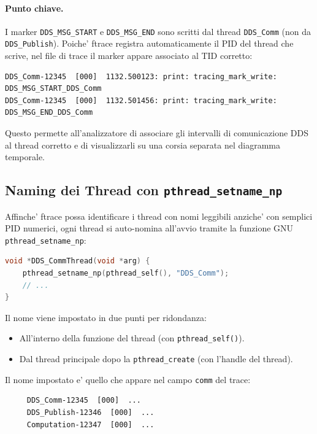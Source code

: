 \paragraph{Punto chiave.}
I marker \texttt{DDS\_MSG\_START} e \texttt{DDS\_MSG\_END} sono scritti
dal thread \texttt{DDS\_Comm} (non da \texttt{DDS\_Publish}). Poiche'
ftrace registra automaticamente il PID del thread che scrive, nel file
di trace il marker appare associato al TID corretto:

\begin{verbatim}
DDS_Comm-12345  [000]  1132.500123: print: tracing_mark_write: DDS_MSG_START_DDS_Comm
DDS_Comm-12345  [000]  1132.501456: print: tracing_mark_write: DDS_MSG_END_DDS_Comm
\end{verbatim}

Questo permette all'analizzatore di associare gli intervalli di comunicazione
DDS al thread corretto e di visualizzarli su una corsia separata nel
diagramma temporale.

\subsection{Naming dei Thread con \texttt{pthread\_setname\_np}}
\label{subsec:naming}

Affinche' ftrace possa identificare i thread con nomi leggibili anziche'
con semplici PID numerici, ogni thread si auto-nomina all'avvio tramite
la funzione GNU \texttt{pthread\_setname\_np}:

\begin{lstlisting}[language=C, caption={Assegnazione del nome al thread DDS\_Comm.}, label={lst:setname}]
void *DDS_CommThread(void *arg) {
    pthread_setname_np(pthread_self(), "DDS_Comm");
    // ...
}
\end{lstlisting}

Il nome viene impostato in due punti per ridondanza:
\begin{itemize}
    \item All'interno della funzione del thread (con \texttt{pthread\_self()}).
    \item Dal thread principale dopo la \texttt{pthread\_create}
          (con l'handle del thread).
\end{itemize}

Il nome impostato e' quello che appare nel campo \texttt{comm} del trace:
\begin{verbatim}
     DDS_Comm-12345  [000]  ...
     DDS_Publish-12346  [000]  ...
     Computation-12347  [000]  ...
\end{verbatim}


